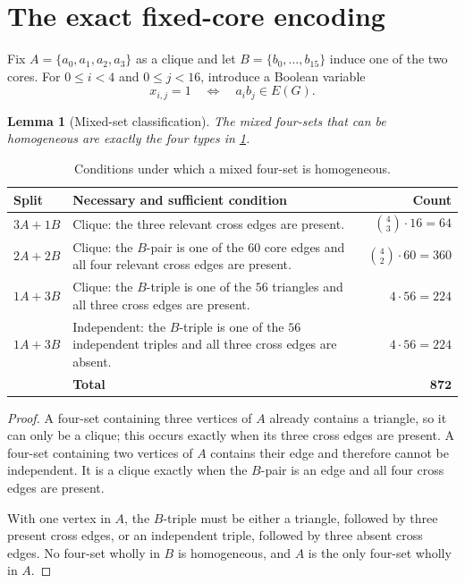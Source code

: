 \documentclass[11pt,a4paper]{article}
\newtheorem{lemma}[theorem]{Lemma}
\theoremstyle{definition}
\theoremstyle{remark}
\begin{document}
\section{The exact fixed-core encoding}\label{sec:encoding}

Fix \(A=\{a_0,a_1,a_2,a_3\}\) as a clique and let
\(B=\{b_0,\ldots,b_{15}\}\) induce one of the two cores.  For
\(0\leq i<4\) and \(0\leq j<16\), introduce a Boolean variable
\[
  x_{i,j}=1\quad\Longleftrightarrow\quad a_i b_j\in E(G).
\]

\begin{lemma}[Mixed-set classification]\label{lem:mixed}
The mixed four-sets that can be homogeneous are exactly the four types in
\cref{tab:mixed}.
\end{lemma}

\begin{table}[ht]
\centering
\caption{Conditions under which a mixed four-set is homogeneous.}
\label{tab:mixed}
\begin{tabularx}{\textwidth}{@{}l X r@{}}
\toprule
Split & Necessary and sufficient condition & Count\\
\midrule
\(3A+1B\) &
Clique: the three relevant cross edges are present. &
\(\binom43\cdot16=64\)\\
\(2A+2B\) &
Clique: the \(B\)-pair is one of the \(60\) core edges and all four
relevant cross edges are present. &
\(\binom42\cdot60=360\)\\
\(1A+3B\) &
Clique: the \(B\)-triple is one of the \(56\) triangles and all three
cross edges are present. &
\(4\cdot56=224\)\\
\(1A+3B\) &
Independent: the \(B\)-triple is one of the \(56\) independent triples
and all three cross edges are absent. &
\(4\cdot56=224\)\\
\midrule
&\textbf{Total}&\(\mathbf{872}\)\\
\bottomrule
\end{tabularx}
\end{table}

\begin{proof}
A four-set containing three vertices of \(A\) already contains a triangle,
so it can only be a clique; this occurs exactly when its three cross edges
are present.  A four-set containing two vertices of \(A\) contains their
edge and therefore cannot be independent.  It is a clique exactly when
the \(B\)-pair is an edge and all four cross edges are present.

With one vertex in \(A\), the \(B\)-triple must be either a triangle,
followed by three present cross edges, or an independent triple, followed
by three absent cross edges.  No four-set wholly in \(B\) is homogeneous,
and \(A\) is the only four-set wholly in \(A\).
\end{proof}
\end{document}
